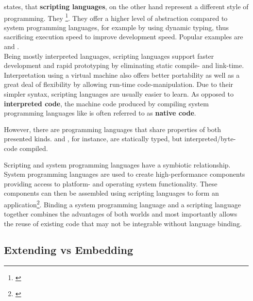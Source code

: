  states, that \textbf{scripting languages}, on the other hand represent a different style of programming. They \footnote{\citep{Ousterhout}}. They offer a higher level of abstraction compared to system programming languages, for example by using dynamic typing, thus sacrificing execution speed to improve development speed. Popular examples are  and .
\\ Being mostly interpreted languages, scripting languages support faster development and rapid prototyping by eliminating static compile- and link-time. Interpretation using a virtual machine also offers better portability as well as a great deal of flexibility by allowing run-time code-manipulation. Due to their simpler syntax, scripting languages are usually easier to learn. 
As opposed to \textbf{interpreted code}, the machine code produced by compiling system programming languages like  is often referred to as \textbf{native code}.

However, there are programming languages that share properties of both presented kinds.  and , for instance, are statically typed, but interpreted/byte-code compiled.

Scripting and system programming languages have a symbiotic relationship. System programming languages are used to create high-performance components providing access to platform- and operating system functionality. These components can then be assembled using scripting languages to form an application\footnote{\citep{Ousterhout}}. Binding a system programming language and a scripting language together combines the advantages of both worlds and most importantly allows the reuse of existing code that may not be integrable without language binding.

\subsection{Extending vs Embedding}

